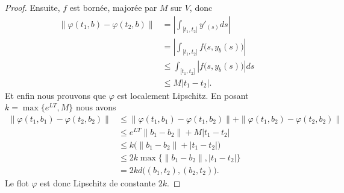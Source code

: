 \begin{proof}
	Ensuite, \( f\) est bornée, majorée par \( M\) sur \( V\), donc
	\begin{subequations}
		\begin{align}
			\| \varphi(t_1,b)-\varphi(t_2,b) \| & =| \int_{\mathopen[ t_1 , t_2 \mathclose]} y'_(s)ds |                   \\
			                                    & =| \int_{\mathopen[ t_1 , t_2 \mathclose]}f\big( s,y_b(s) \big) |       \\
			                                    & \leq \int_{\mathopen[ t_1 , t_2 \mathclose]}| f\big( s,y_b(s) \big) |ds \\
			                                    & \leq M| t_1-t_2 |.
		\end{align}
	\end{subequations}
	Et enfin nous prouvons que \( \varphi\) est localement Lipschitz. En posant \( k=\max\{  e^{LT},M \}\) nous avons
	\begin{subequations}
		\begin{align}
			\| \varphi(t_1,b_1)-\varphi(t_2,b_2) \| & \leq \| \varphi(t_1,b_1)-\varphi(t_1,b_2) \|+\| \varphi(t_1,b_2)-\varphi(t_2,b_2) \| \\
			                                        & \leq  e^{LT}\| b_1-b_2 \|+M| t_1-t_2 |                                               \\
			                                        & \leq k\big( \| b_1-b_2 \|+| t_1-t_2 | \big)                                          \\
			                                        & \leq 2k\max\{ \| b_1-b_2 \|,| t_1-t_2 | \}                                           \\
			                                        & =2kd\big(  (b_1,t_2),(b_2,t_2)  \big).
		\end{align}
	\end{subequations}
	Le flot \( \varphi\) est donc Lipschitz de constante \( 2k\).
\end{proof}

